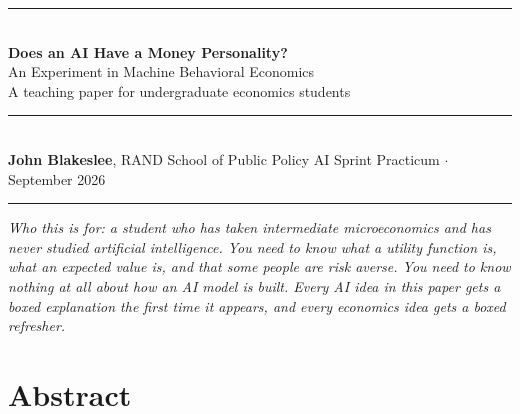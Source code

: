 \documentclass[11pt]{article}
\begin{document}
\begin{flushleft}
{\color{randpurple}\rule{\linewidth}{1.6pt}}\\[10pt]
{\LARGE\bfseries\color{ink} Does an AI Have a Money Personality?}\\[6pt]
{\Large\color{ink} An Experiment in Machine Behavioral Economics}\\[9pt]
{\large\color{purpledk} A teaching paper for undergraduate economics students}\\[11pt]
{\color{rulegray}\rule{\linewidth}{0.8pt}}\\[7pt]
{\small\color{ink}\textbf{John Blakeslee}, RAND School of Public Policy \hfill
 AI Sprint Practicum \quad$\cdot$\quad September 2026}\\[3pt]
{\color{randpurple}\rule{\linewidth}{1.6pt}}
\end{flushleft}

\vspace{6pt}

\begin{tcolorbox}[
  colframe=randpurple, colback=purplebg, boxrule=0.6pt, sharp corners,
  left=12pt, right=12pt, top=9pt, bottom=9pt, before skip=2pt, after skip=13pt]
{\small\itshape\color{ink} Who this is for: a student who has taken intermediate
microeconomics and has never studied artificial intelligence. You need to know what a utility
function is, what an expected value is, and that some people are risk averse. You need to know
nothing at all about how an AI model is built. Every AI idea in this paper gets a boxed
explanation the first time it appears, and every economics idea gets a boxed refresher.}
\end{tcolorbox}

\section*{Abstract}
\small
\end{document}
